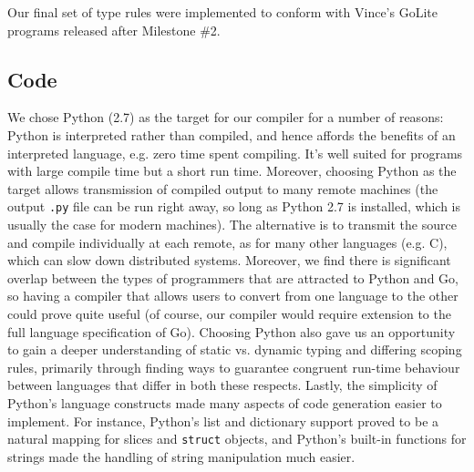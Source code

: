 \documentclass{article}
\begin{document}
Our final set of type rules were implemented to conform with Vince's GoLite programs released after Milestone \#2.

\subsection{Code}

We chose Python (2.7) as the target for our compiler for a number of reasons: Python is interpreted rather than compiled, and hence affords the benefits of an interpreted language, e.g. zero time spent compiling. It's well suited for programs with large compile time but a short run time. Moreover, choosing Python as the target allows transmission of compiled output to many remote machines (the output \texttt{.py} file can be run right away, so long as Python 2.7 is installed, which is usually the case for modern machines). The alternative is to transmit the source and compile individually at each remote, as  for many other languages (e.g. C), which can slow down distributed systems. Moreover, we find there is significant overlap between the types of programmers that are attracted to Python and Go, so having a compiler that allows users to convert from one language to the other could prove quite useful (of course, our compiler would require extension to the full language specification of Go). Choosing Python also gave us an opportunity to gain a deeper understanding of static vs. dynamic typing and differing scoping rules, primarily through finding ways to guarantee congruent run-time behaviour between languages that differ in both these respects. Lastly, the simplicity of Python's language constructs made many aspects of code generation easier to implement. For instance, Python's list and dictionary support proved to be a natural mapping for slices and \texttt{struct} objects, and Python's built-in functions for strings made the handling of string manipulation much easier.
\end{document}
